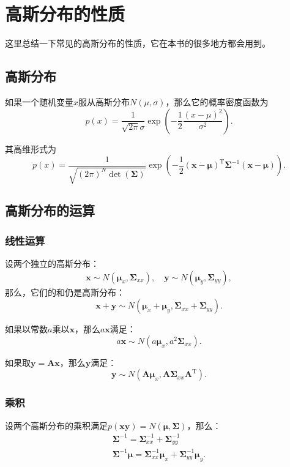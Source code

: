 \chapter{高斯分布的性质}
这里总结一下常见的高斯分布的性质，它在本书的很多地方都会用到。
\section{高斯分布}
如果一个随机变量$x$服从高斯分布$N(\mu, \sigma)$，那么它的概率密度函数为
\begin{equation}
p\left( x \right) = \frac{1}{{\sqrt {2\pi } \sigma }}\exp \left( { - \frac{1}{2}\frac{{{{\left( {x - \mu } \right)}^2}}}{{{\sigma ^2}}}} \right).
\end{equation}

其高维形式为
\begin{equation}
p\left( x \right) = \frac{1}{{\sqrt {(2\pi)^N  \det \left( \bm{\Sigma } \right) }}}\exp \left( { - \frac{1}{2}{{\left( {\bm{x} - \bm{\mu} } \right)}^\mathrm{T}}{\bm{\Sigma} ^{ - 1}}\left( {\bm{x} - \bm{\mu} } \right)} \right).
\end{equation}

\section{高斯分布的运算}
\subsection{线性运算}
设两个独立的高斯分布：
\[
\bm{x} \sim N( \bm{\mu}_x, \bm{\Sigma}_{xx} ), \quad \bm{y} \sim N( \bm{\mu}_y, \bm{\Sigma}_{yy} ),
\]
那么，它们的和仍是高斯分布：
\begin{equation}
\bm{x}+\bm{y} \sim N( \bm{\mu}_x + \bm{\mu}_y, \bm{\Sigma}_{xx} + \bm{\Sigma}_{yy}).
\end{equation}

如果以常数$a$乘以$\bm{x}$，那么$a \bm{x}$满足：
\begin{equation}
a\bm{x} \sim N( a \bm{\mu}_x, a^2 \bm{\Sigma}_{xx}).
\end{equation}

如果取$\bm{y} = \bm{A} \bm{x}$，那么$\bm{y}$满足：
\begin{equation}
\bm{y} \sim N( \bm{A} \bm{\mu}_x, \bm{A} \bm{\Sigma}_{xx} \bm{A}^\mathrm{T}).
\end{equation}

\subsection{乘积}
设两个高斯分布的乘积满足$p\left( \bm{xy} \right) = N\left( {\bm{\mu} ,\bm{\Sigma}} \right)$，那么：
\begin{equation}
\begin{array}{l}
{\bm{\Sigma}^{-1}} = \bm{\Sigma}_{xx}^{-1} + \bm{\Sigma}_{yy}^{-1} \\
\bm{\Sigma}^{-1} \bm{\mu} = \bm{\Sigma}_{xx}^{-1}{\bm{\mu}_x} + \bm{\Sigma}_{yy}^{-1}{\bm{\mu}_y}.
\end{array}
\end{equation}


